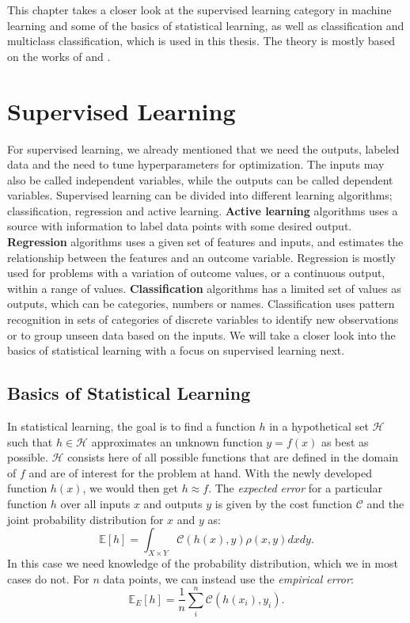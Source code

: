 \documentclass[a4paper, american, 12pt]{report}
\begin{document}
	This chapter takes a closer look at the supervised learning category in machine learning and some of the basics of statistical learning, as well as classification and multiclass classification, which is used in this thesis. The theory is mostly based on the works of \citet{hastie2009elements} and \citet{mehta2019high}.
	
	
	\section{Supervised Learning}
	\label{sect:Theory-Supervised Learning}
	For supervised learning, we already mentioned that we need the outputs, labeled data and the need to tune hyperparameters for optimization. The inputs may also be called independent variables, while the outputs can be called dependent variables. Supervised learning can be divided into different learning algorithms; classification, regression and active learning. \textbf{Active learning} algorithms uses a source with information to label data points with some desired output. \textbf{Regression} algorithms uses a given set of features and inputs, and estimates the relationship between the features and an outcome variable. Regression is mostly used for problems with a variation of outcome values, or a continuous output, within a range of values. \textbf{Classification} algorithms has a limited set of values as outputs, which can be categories, numbers or names. Classification uses pattern recognition in sets of categories of discrete variables to identify new observations or to group unseen data based on the inputs. We will take a closer look into the basics of statistical learning with a focus on supervised learning next.
	
	
	\subsection{Basics of Statistical Learning}
	\label{subsect:Theory-Statistics}
	In statistical learning, the goal is to find a function $h$ in a hypothetical set $\mathcal{H}$ such that $h\in\mathcal{H}$ approximates an unknown function $y=f(x)$ as best as possible. $\mathcal{H}$ consists here of all possible functions that are defined in the domain of $f$ and are of interest for the problem at hand. With the newly developed function $h(x)$, we would then get $h\approx f$. The \textit{expected error} for a particular function $h$ over all inputs $x$ and outputs $y$ is given by the cost function $\mathcal{C}$ and the joint probability distribution for $x$ and $y$ as:
	\begin{equation}
	\label{eq:Exp_error}
		\mathds{E}[h]=\int_{X\times Y} \mathcal{C}(h(x),y)\rho(x,y)dxdy.
	\end{equation}
	In this case we need knowledge of the probability distribution, which we in most cases do not. For $n$ data points, we can instead use the \textit{empirical error}:
	\begin{equation}
	\label{eq:Emp_error}
		\mathds{E}_E[h]=\frac{1}{n}\sum_{i}^{n}\mathcal{C}(h(x_i),y_i).
	\end{equation}
	
\end{document}

